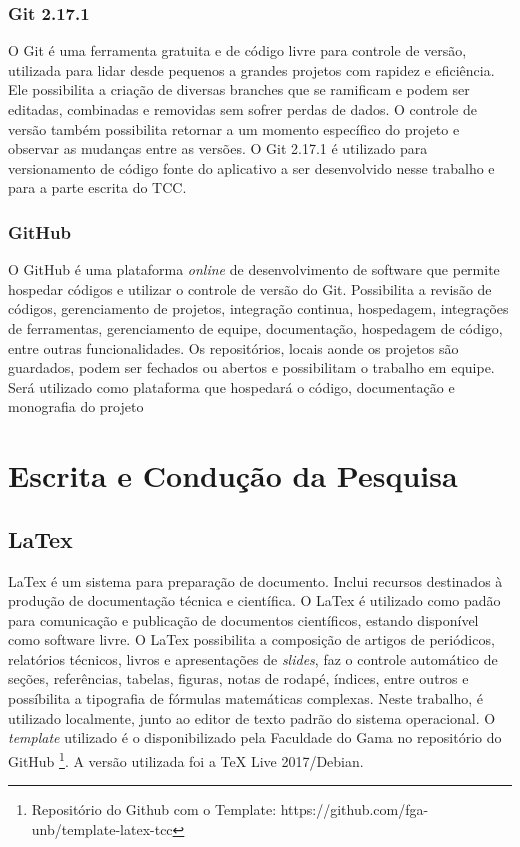 \subsubsection{Git 2.17.1}

O Git \cite{git2020} é uma ferramenta gratuita e de código livre para controle 
de versão, utilizada para lidar desde pequenos a grandes projetos com rapidez e 
eficiência. Ele possibilita a criação de diversas branches que se ramificam e 
podem ser editadas, combinadas e removidas sem sofrer perdas de dados. O controle de 
versão também possibilita retornar a um momento específico do projeto e observar as 
mudanças entre as versões. O Git 2.17.1 é utilizado para versionamento de código fonte 
do aplicativo a ser desenvolvido nesse trabalho 
e para a parte escrita do TCC.


\subsubsection{GitHub}

O GitHub \cite{github2020} é uma plataforma \emph{online} de desenvolvimento de 
software que permite hospedar códigos e utilizar o controle de versão do Git. 
Possibilita a revisão de códigos, gerenciamento de projetos, integração continua, 
hospedagem, integrações de ferramentas, gerenciamento de equipe, documentação, 
hospedagem de código, entre outras funcionalidades. Os repositórios, locais 
aonde os projetos são guardados, podem ser fechados ou abertos e possibilitam o 
trabalho em equipe. Será utilizado como plataforma que hospedará o código, 
documentação e monografia do projeto

\section{Escrita e Condução da Pesquisa}

\subsection{LaTex}

LaTex \cite{latex2020} é um sistema para preparação de documento. Inclui 
recursos destinados à produção de documentação técnica e científica. O LaTex é 
utilizado como padão para comunicação e publicação de documentos científicos, estando 
disponível como software livre. O LaTex possibilita a composição de artigos de 
periódicos, relatórios técnicos, livros e apresentações de \emph{slides}, faz 
o controle automático de seções, referências, tabelas, figuras, notas de rodapé, 
índices, entre outros e possíbilita a tipografia de fórmulas matemáticas 
complexas. Neste trabalho, é utilizado localmente, junto ao editor de texto 
padrão do sistema operacional. O \emph{template} utilizado é o disponibilizado pela 
Faculdade do Gama no repositório do GitHub \footnote{Repositório do Github com o Template: https://github.com/fga-unb/template-latex-tcc}.
A versão utilizada foi a TeX Live 2017/Debian.

